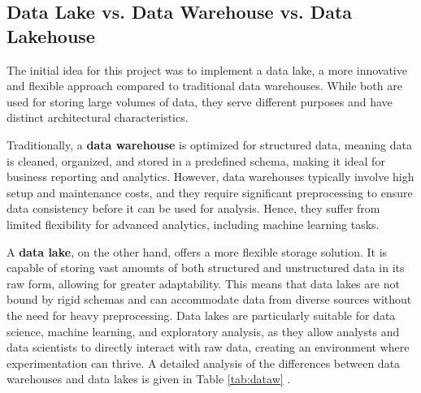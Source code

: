 \subsection{Data Lake vs. Data Warehouse vs. Data Lakehouse}
The initial idea for this project was to implement a data lake, a more innovative and flexible approach compared to traditional data warehouses. While both are used for storing large volumes of data, they serve different purposes and have distinct architectural characteristics.

Traditionally, a \textbf{data warehouse} is optimized for structured data, meaning data is cleaned, organized, and stored in a predefined schema, making it ideal for business reporting and analytics. However, data warehouses typically involve high setup and maintenance costs, and they require significant preprocessing to ensure data consistency before it can be used for analysis. Hence, they suffer from limited flexibility for advanced analytics, including machine learning tasks.

A \textbf{data lake}, on the other hand, offers a more flexible storage solution. It is capable of storing vast amounts of both structured and unstructured data in its raw form, allowing for greater adaptability. This means that data lakes are not bound by rigid schemas and can accommodate data from diverse sources without the need for heavy preprocessing. Data lakes are particularly suitable for data science, machine learning, and exploratory analysis, as they allow analysts and data scientists to directly interact with raw data, creating an environment where experimentation can thrive. A detailed analysis of the differences between data warehouses and data lakes is given in Table \ref{tab:dataw} \cite{nambiar2022overview}.

